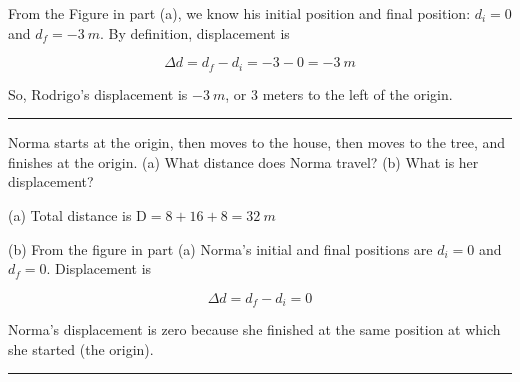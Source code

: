 \documentclass{article}
\begin{document}
From the Figure in part (a), we know his initial position and final position: $d_i = 0$ and $d_f = -\SI{3}{m}$. By definition, displacement is

\begin{equation*}
    \Delta{d} = d_f - d_i = -3 - 0 = -\SI{3}{m}
\end{equation*}

So, Rodrigo's displacement is $-\SI{3}{m}$, or 3 meters to the left of the origin.

\hrule

\begin{example} \label{mAnrq8}
Norma starts at the origin, then moves to the house, then moves to the tree, and finishes at the origin. (a) What distance does Norma travel? (b) What is her displacement? 
\end{example}

 (a) Total distance is $\mathrm{D} = 8 + 16 + 8 = \SI{32}{m}$

\begin{center}
\end{center}

(b) From the figure in part (a) Norma's initial and final positions are $d_i = 0$ and $d_f = 0$. Displacement is 

\begin{equation*}
    \Delta d = d_f - d_i = 0
\end{equation*}

Norma's displacement is zero  because she finished at the same position at which she started (the origin).

\hrule

\vspace{1em}
\end{document}
